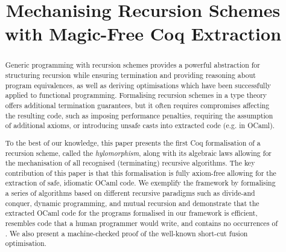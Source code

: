 \documentclass{llncs}
\title{Mechanising Recursion Schemes with Magic-Free Coq Extraction}
\begin{document}
\maketitle

\begin{abstract}
  Generic programming with recursion schemes provides a powerful abstraction for
structuring recursion while ensuring termination and providing reasoning about
program equivalences, as well as deriving optimisations which have been
successfully applied to functional programming. Formalising recursion schemes in
a type theory offers additional termination guarantees, but it often requires
compromises affecting the resulting code, such as imposing performance
penalties, requiring the assumption of additional axioms, or introducing unsafe
casts into extracted code (e.g.  in OCaml).

To the best of our knowledge, this paper presents the first Coq formalisation of
a recursion scheme, called the \emph{hylomorphism}, along with its algebraic
laws allowing for the mechanisation of all recognised (terminating) recursive
algorithms. The key contribution of this paper is that this formalisation is
fully axiom-free allowing for the extraction of safe, idiomatic OCaml code. We
exemplify the framework by formalising a series of algorithms based on different
recursive paradigms such as divide-and conquer, dynamic programming, and mutual
recursion and demonstrate that the extracted OCaml code for the programs
formalised in our framework is efficient, resembles code that a human programmer
would write, and contains no occurrences of .  We also present
a machine-checked proof of the well-known short-cut fusion optimisation.
\end{abstract}
\end{document}
